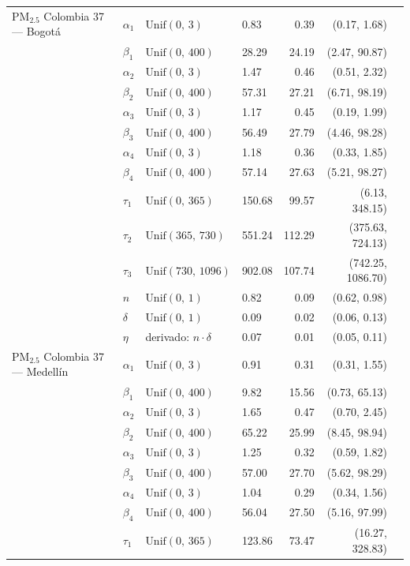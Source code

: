 \begin{longtable}{llllrrr}
PM$_{2.5}$ Colombia 37 --- Bogot\'{a} & $\alpha_{1}$ & $\text{Unif}(0,\,3)$ & 0.83 & 0.39 & (0.17, 1.68) \\
 & $\beta_{1}$ & $\text{Unif}(0,\,400)$ & 28.29 & 24.19 & (2.47, 90.87) \\
 & $\alpha_{2}$ & $\text{Unif}(0,\,3)$ & 1.47 & 0.46 & (0.51, 2.32) \\
 & $\beta_{2}$ & $\text{Unif}(0,\,400)$ & 57.31 & 27.21 & (6.71, 98.19) \\
 & $\alpha_{3}$ & $\text{Unif}(0,\,3)$ & 1.17 & 0.45 & (0.19, 1.99) \\
 & $\beta_{3}$ & $\text{Unif}(0,\,400)$ & 56.49 & 27.79 & (4.46, 98.28) \\
 & $\alpha_{4}$ & $\text{Unif}(0,\,3)$ & 1.18 & 0.36 & (0.33, 1.85) \\
 & $\beta_{4}$ & $\text{Unif}(0,\,400)$ & 57.14 & 27.63 & (5.21, 98.27) \\
 & $\tau_{1}$ & $\text{Unif}(0,\,365)$ & 150.68 & 99.57 & (6.13, 348.15) \\
 & $\tau_{2}$ & $\text{Unif}(365,\,730)$ & 551.24 & 112.29 & (375.63, 724.13) \\
 & $\tau_{3}$ & $\text{Unif}(730,\,1096)$ & 902.08 & 107.74 & (742.25, 1086.70) \\
 & $n$ & $\text{Unif}(0,\,1)$ & 0.82 & 0.09 & (0.62, 0.98) \\
 & $\delta$ & $\text{Unif}(0,\,1)$ & 0.09 & 0.02 & (0.06, 0.13) \\
 & $\eta$ & derivado: $n \cdot \delta$ & 0.07 & 0.01 & (0.05, 0.11) \\
\midrule
PM$_{2.5}$ Colombia 37 --- Medell\'{i}n & $\alpha_{1}$ & $\text{Unif}(0,\,3)$ & 0.91 & 0.31 & (0.31, 1.55) \\
 & $\beta_{1}$ & $\text{Unif}(0,\,400)$ & 9.82 & 15.56 & (0.73, 65.13) \\
 & $\alpha_{2}$ & $\text{Unif}(0,\,3)$ & 1.65 & 0.47 & (0.70, 2.45) \\
 & $\beta_{2}$ & $\text{Unif}(0,\,400)$ & 65.22 & 25.99 & (8.45, 98.94) \\
 & $\alpha_{3}$ & $\text{Unif}(0,\,3)$ & 1.25 & 0.32 & (0.59, 1.82) \\
 & $\beta_{3}$ & $\text{Unif}(0,\,400)$ & 57.00 & 27.70 & (5.62, 98.29) \\
 & $\alpha_{4}$ & $\text{Unif}(0,\,3)$ & 1.04 & 0.29 & (0.34, 1.56) \\
 & $\beta_{4}$ & $\text{Unif}(0,\,400)$ & 56.04 & 27.50 & (5.16, 97.99) \\
 & $\tau_{1}$ & $\text{Unif}(0,\,365)$ & 123.86 & 73.47 & (16.27, 328.83) \\

\end{longtable}
